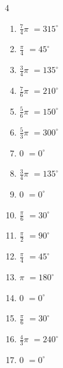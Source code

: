 \begin{multicols}{4}
\begin{enumerate}
  \item $\displaystyle \frac{7}{4}\pi$
        $\displaystyle =315^{\circ}$

  \item $\displaystyle \frac{\pi}{4}$
        $\displaystyle =45^{\circ}$

  \item $\displaystyle \frac{3}{4}\pi$
        $\displaystyle =135^{\circ}$

  \item $\displaystyle \frac{7}{6}\pi$
        $\displaystyle =210^{\circ}$

  \item $\displaystyle \frac{5}{6}\pi$
        $\displaystyle =150^{\circ}$

  \item $\displaystyle \frac{5}{3}\pi$
        $\displaystyle =300^{\circ}$

  \item $\displaystyle 0$
        $\displaystyle =0^{\circ}$

  \item $\displaystyle \frac{3}{4}\pi$
        $\displaystyle =135^{\circ}$

  \item $\displaystyle 0$
        $\displaystyle =0^{\circ}$

  \item $\displaystyle \frac{\pi}{6}$
        $\displaystyle =30^{\circ}$

\columnbreak %

  \item $\displaystyle \frac{\pi}{2}$
        $\displaystyle =90^{\circ}$

  \item $\displaystyle \frac{\pi}{4}$
        $\displaystyle =45^{\circ}$

  \item $\displaystyle \pi$
        $\displaystyle =180^{\circ}$

  \item $\displaystyle 0$
        $\displaystyle =0^{\circ}$

  \item $\displaystyle \frac{\pi}{6}$
        $\displaystyle =30^{\circ}$

  \item $\displaystyle \frac{4}{3}\pi$
        $\displaystyle =240^{\circ}$

  \item $\displaystyle 0$
        $\displaystyle =0^{\circ}$


\end{enumerate}
\end{multicols}
